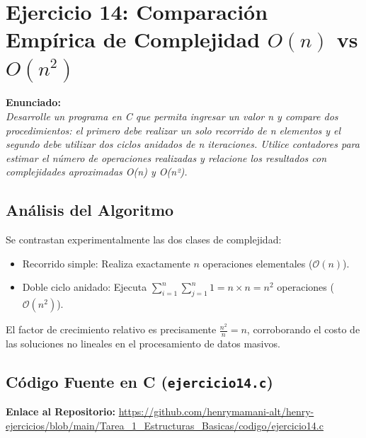 \documentclass[12pt]{article}
\begin{document}
\section*{Ejercicio 14: Comparación Empírica de Complejidad $O(n)$ vs $O(n^2)$}

\noindent\textbf{Enunciado:}\\
\textit{Desarrolle un programa en C que permita ingresar un valor n y compare dos procedimientos: el primero debe realizar un solo recorrido de n elementos y el segundo debe utilizar dos ciclos anidados de n iteraciones. Utilice contadores para estimar el número de operaciones realizadas y relacione los resultados con complejidades aproximadas O(n) y O(n²).}

\subsection*{Análisis del Algoritmo}
Se contrastan experimentalmente las dos clases de complejidad:
\begin{itemize}
    \item Recorrido simple: Realiza exactamente $n$ operaciones elementales ($\mathcal{O}(n)$).
    \item Doble ciclo anidado: Ejecuta $\sum_{i=1}^n \sum_{j=1}^n 1 = n \times n = n^2$ operaciones ($\mathcal{O}(n^2)$).
\end{itemize}
El factor de crecimiento relativo es precisamente $\frac{n^2}{n} = n$, corroborando el costo de las soluciones no lineales en el procesamiento de datos masivos.

\subsection*{Código Fuente en C (\texttt{ejercicio14.c})}
\noindent\textbf{Enlace al Repositorio:} \url{https://github.com/henrymamani-alt/henry-ejercicios/blob/main/Tarea_1_Estructuras_Basicas/codigo/ejercicio14.c}
\end{document}
